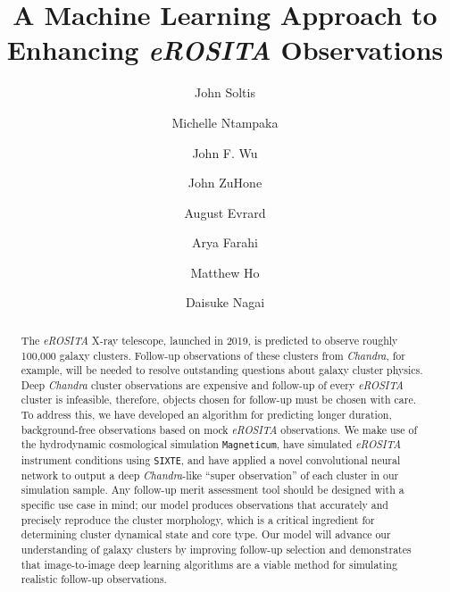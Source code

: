 \documentclass[twocolumn, 11pt]{aastex63}%
\begin{document}
\title{A Machine Learning Approach to Enhancing \textit{eROSITA} Observations}

\author{John Soltis}
\author{Michelle Ntampaka}
\author{John F. Wu}

\author{John ZuHone}

\author{August Evrard}
\author{Arya Farahi}
\author{Matthew Ho}
\author{Daisuke Nagai}

\begin{abstract}
    The \textit{eROSITA} X-ray telescope, launched in 2019, is predicted to observe roughly 100,000 galaxy clusters. Follow-up observations of these clusters from \textit{Chandra}, for example, will be needed to resolve outstanding questions about galaxy cluster physics. Deep \textit{Chandra} cluster observations are expensive and follow-up of every \textit{eROSITA} cluster is infeasible, therefore, objects chosen for follow-up must be chosen with care. To address this, we have developed an algorithm for predicting longer duration, background-free observations based on mock \textit{eROSITA} observations. We make use of the hydrodynamic cosmological simulation \texttt{Magneticum}, have simulated \textit{eROSITA} instrument conditions using \texttt{SIXTE}, and have applied a novel convolutional neural network to output a deep \textit{Chandra}-like ``super observation'' of each cluster in our simulation sample. Any follow-up merit assessment tool should be designed with a specific use case in mind; our model produces observations that accurately and precisely reproduce the cluster morphology, which is a critical ingredient for determining cluster dynamical state and core type. Our model will advance our understanding of galaxy clusters by improving follow-up selection and demonstrates that image-to-image deep learning algorithms are a viable method for simulating realistic follow-up observations.\\
\end{abstract}
\end{document}
